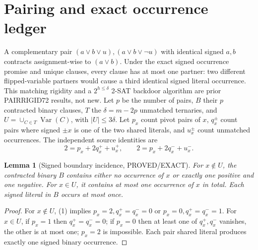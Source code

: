 \documentclass[11pt]{article}
\newtheorem{lemma}{Lemma}
\begin{document}
\section{Pairing and exact occurrence ledger}
A complementary pair $(a\vee b\vee u),(a\vee b\vee\neg u)$ with identical signed $a,b$ contracts assignment-wise to $(a\vee b)$. Under the exact signed occurrence promise and unique clauses, every clause has at most one partner: two different flipped-variable partners would cause a third identical signed literal occurrence. This matching rigidity and a $2^{h\le\delta}$ 2-SAT backdoor algorithm are prior PAIRRIGID72 results, not new.
Let $p$ be the number of pairs, $B$ their $p$ contracted binary clauses, $T$ the $\delta=m-2p$ unmatched ternaries, and $U=\cup_{C\in T}\operatorname{Var}(C)$, with $|U|\le3\delta$. Let $p_x$ count pivot pairs of $x$, $q_x^\pm$ count pairs where signed $\pm x$ is one of the two shared literals, and $u_x^\pm$ count unmatched occurrences. The independent source identities are
\[
2=p_x+2q_x^++u_x^+,\qquad 2=p_x+2q_x^-+u_x^-.
\tag{1}
\]
\begin{lemma}[Signed boundary incidence, PROVED/EXACT]
For $x\notin U$, the contracted binary $B$ contains either no occurrence of $x$ or exactly one positive and one negative. For $x\in U$, it contains at most one occurrence of $x$ in total. Each signed literal in $B$ occurs at most once.
\end{lemma}
\begin{proof}
For $x\notin U$, (1) implies $p_x=2,q_x^+=q_x^-=0$ or $p_x=0,q_x^+=q_x^-=1$. For $x\in U$, if $p_x=1$ then $q_x^+=q_x^-=0$; if $p_x=0$ then at least one of $q_x^+,q_x^-$ vanishes, the other is at most one; $p_x=2$ is impossible. Each pair shared literal produces exactly one signed binary occurrence.
\end{proof}
\end{document}
